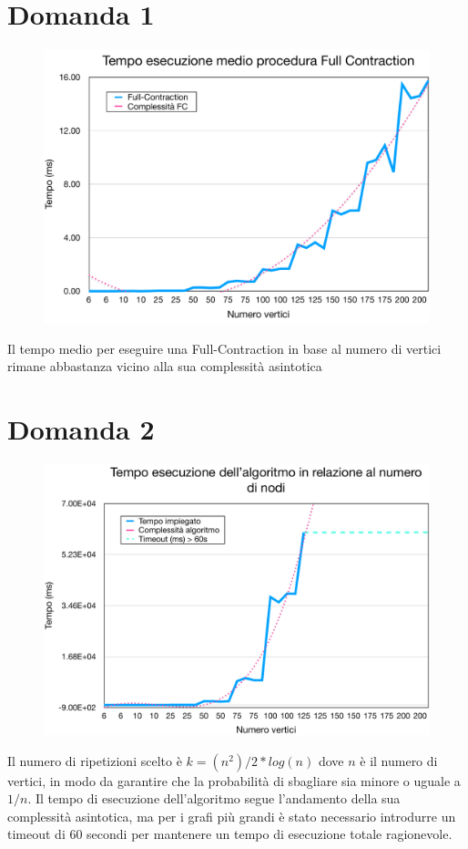 \documentclass[a4paper]{article}
\begin{document}
\section{Domanda 1}
\begin{figure}[H]
	\centering
	\includegraphics[width=17cm]{fullcontraction}
	\label{fig:fullcontraction}
\end{figure}
Il tempo medio per eseguire una Full-Contraction in base al numero di vertici rimane abbastanza vicino alla sua complessità asintotica

\section{Domanda 2}
\begin{figure}[H]
	\centering
	\includegraphics[width=17cm]{tempoesecvsnumnodi}
	\label{fig:tempoesecvsnumnodi}
\end{figure}
Il numero di ripetizioni scelto è $k = (n^2)/2 * log(n)$ dove $n$ è il numero di vertici, in modo da garantire che la probabilità di sbagliare sia minore o uguale a $1/n$.
Il tempo di esecuzione dell'algoritmo segue l'andamento della sua complessità asintotica, ma per i grafi più grandi è stato necessario introdurre un timeout di 60 secondi per mantenere un tempo di esecuzione totale ragionevole.
\end{document}
